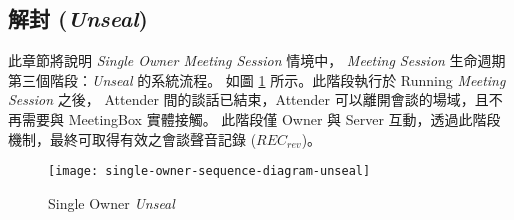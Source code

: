 \subsection{解封 ({\it Unseal})}

    此章節將說明 {\it Single Owner Meeting Session} 情境中，
{\it Meeting Session} 生命週期第三個階段：{\it Unseal} 的系統流程。
如圖 \ref{fig.s-o-unseal} 所示。此階段執行於 Running {\it Meeting Session} 之後，
Attender 間的談話已結束，Attender 可以離開會談的場域，且不再需要與 MeetingBox 實體接觸。
此階段僅 Owner 與 Server 互動，透過此階段機制，最終可取得有效之會談聲音記錄 ($REC_{rev}$)。

\begin{figure}[H]
    \centering
    \texttt{[image: single-owner-sequence-diagram-unseal]}
    \caption{Single Owner {\it Unseal}}
    \label{fig.s-o-unseal}
\end{figure}

